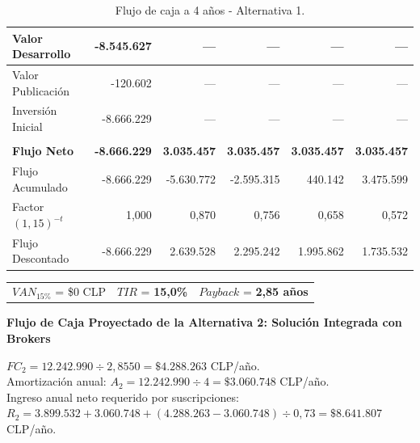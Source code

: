 \begin{table}[h!]
\begin{tabular}{|m{3.2cm}|r|r|r|r|r|}
        Valor Desarrollo & -8.545.627 & --- & --- & --- & --- \\ \hline
        Valor Publicación & -120.602 & --- & --- & --- & --- \\ \hline
        \rowcolor[HTML]{F3E5F5} 
        Inversión Inicial & -8.666.229 & --- & --- & --- & --- \\ \hline
        & & & & & \\ \hline
        \rowcolor[HTML]{E8F5E9}
        \textbf{Flujo Neto} & \textbf{-8.666.229} & \textbf{3.035.457} & \textbf{3.035.457} & \textbf{3.035.457} & \textbf{3.035.457} \\ \hline
        Flujo Acumulado & -8.666.229 & -5.630.772 & -2.595.315 & 440.142 & 3.475.599 \\ \hline
        \rowcolor[HTML]{F3E5F5}
        Factor $(1{,}15)^{-t}$ & 1,000 & 0,870 & 0,756 & 0,658 & 0,572 \\ \hline
        \rowcolor[HTML]{F3E5F5}
        Flujo Descontado & -8.666.229 & 2.639.528 & 2.295.242 & 1.995.862 & 1.735.532 \\ \hline
    \end{tabular}
    \caption{Flujo de caja a 4 años - Alternativa 1.}
    \label{tab:flujo_alt1}
\end{table}

\begin{center}
\begin{tabular}{lll}
    $VAN_{15\%}$ = \$0 CLP \quad & $TIR$ = \textbf{15,0\%} \quad & $Payback$ = \textbf{2,85 años}
\end{tabular}
\end{center}

\newpage
\textbf{Flujo de Caja Proyectado de la Alternativa 2: Solución Integrada con Brokers}

$FC_2 = 12.242.990 \div 2{,}8550 = \$4.288.263$ CLP/año.\\
Amortización anual: $A_2 = 12.242.990 \div 4 = \$3.060.748$ CLP/año.\\
Ingreso anual neto requerido por suscripciones:\\ $R_2 = 3.899.532 + 3.060.748 + (4.288.263 - 3.060.748) \div 0{,}73 = \$8.641.807$ CLP/año.

